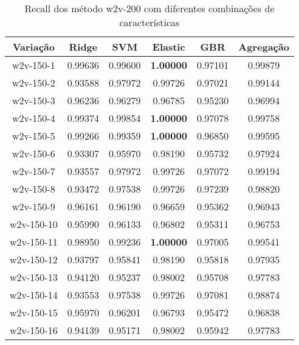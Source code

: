 \begin{table}[H]
\label{tab:recallw2v150}
\centering
\begin{tabular}{|c| c c  c  c  c| }
\hline
Variação &  Ridge & SVM & Elastic & GBR & Agregação  \\ 
\hline
w2v-150-1 & 0.99636 & 0.99600 & \textbf{1.00000} & 0.97101 & 0.99879 \\
\hline
w2v-150-2 & 0.93588 & 0.97972 & 0.99726 & 0.97021 & 0.99144 \\
\hline
w2v-150-3 & 0.96236 & 0.96279 & 0.96785 & 0.95230 & 0.96994 \\
\hline
w2v-150-4 & 0.99374 & 0.99854 & \textbf{1.00000} & 0.97078 & 0.99758 \\
\hline
w2v-150-5 & 0.99266 & 0.99359 & \textbf{1.00000} & 0.96850 & 0.99595 \\
\hline
w2v-150-6 & 0.93307 & 0.95970 & 0.98190 & 0.95732 & 0.97924 \\
\hline
w2v-150-7 & 0.93557 & 0.97972 & 0.99726 & 0.97072 & 0.99194 \\
\hline
w2v-150-8 & 0.93472 & 0.97538 & 0.99726 & 0.97239 & 0.98820 \\
\hline
w2v-150-9 & 0.96161 & 0.96190 & 0.96659 & 0.95362 & 0.96943 \\
\hline
w2v-150-10 & 0.95990 & 0.96133 & 0.96802 & 0.95311 & 0.96753 \\
\hline
w2v-150-11 & 0.98950 & 0.99236 & \textbf{1.00000} & 0.97005 & 0.99541 \\
\hline
w2v-150-12 & 0.93797 & 0.95841 & 0.98190 & 0.95818 & 0.97935 \\
\hline
w2v-150-13 & 0.94120 & 0.95237 & 0.98002 & 0.95708 & 0.97783 \\
\hline
w2v-150-14 & 0.93553 & 0.97538 & 0.99726 & 0.97081 & 0.98874 \\
\hline
w2v-150-15 & 0.95970 & 0.96201 & 0.96793 & 0.95472 & 0.96838 \\
\hline
w2v-150-16 & 0.94139 & 0.95171 & 0.98002 & 0.95942 & 0.97783 \\
\hline
\end{tabular}
\caption{Recall dos método w2v-200 com diferentes combinações de características}
\end{table}

